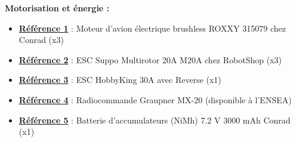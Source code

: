 \documentclass[a4paper,11pt]{report}
\begin{document}
				\textbf{Motorisation et énergie :}
				\begin{itemize}
							\item \textbf{\href{http://www.conrad.fr/ce/fr/product/231891/Moteur-davion-lectrique-brushless-ROXXY-315079?ref=searchDetail}{Référence 1}} : Moteur d'avion électrique brushless ROXXY 315079 chez Conrad (x3)
							\item \textbf{\href{https://www.robotshop.com/eu/fr/esc-multirotor-20a-m20a.html}{Référence 2}} : ESC Suppo Multirotor 20A M20A chez RobotShop (x3)
							\item \textbf{\href{https://hobbyking.com/fr_fr/hobbykingr-tm-brushless-car-esc-30a-w-reverse.html}{Référence 3}} : ESC HobbyKing 30A avec Reverse (x1)
							\item \textbf{\href{https://www.topmodel.fr/product-detail-18656-graupner-mx-20-hott-12160?lang=fr}{Référence 4}} : Radiocommande Graupner MX-20 (disponible à l'ENSEA)
							\item \textbf{\href{http://www.conrad.fr/ce/fr/product/206028/Batterie-daccumulateurs-NiMh-72-V-3000-mAh-Conrad-energy-206028-stick-fiche-Tamiya-mle?ref=searchDetail}{Référence 5}} : Batterie d'accumulateurs (NiMh) 7.2 V 3000 mAh Conrad (x1)
				\end{itemize}
\end{document}

